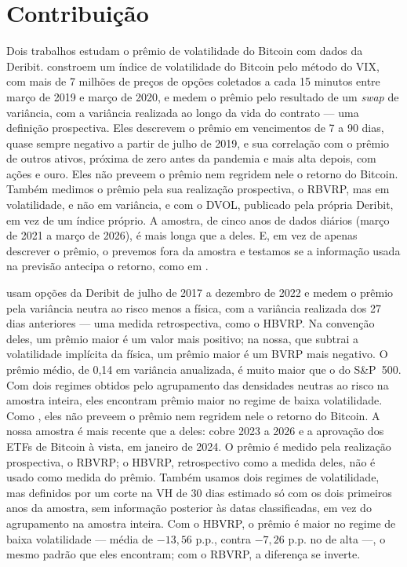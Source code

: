 \section*{Contribuição}
\label{sec:intro-contribuicao}

Dois trabalhos estudam o prêmio de volatilidade do Bitcoin com dados da
Deribit. \citet{alexanderImeraj2019} constroem um índice de volatilidade do
Bitcoin pelo método do VIX, com mais de 7 milhões de preços de opções coletados
a cada 15 minutos entre março de 2019 e março de 2020, e medem o prêmio pelo
resultado de um \textit{swap} de variância, com a variância realizada ao longo
da vida do contrato --- uma definição prospectiva. Eles descrevem o prêmio em
vencimentos de 7 a 90 dias, quase sempre negativo a partir de julho de 2019, e
sua correlação com o prêmio de outros ativos, próxima de zero antes da pandemia
e mais alta depois, com ações e ouro. Eles não preveem o prêmio nem regridem
nele o retorno do Bitcoin. Também medimos o prêmio pela sua
realização prospectiva, o RBVRP, mas em volatilidade, e não em variância, e com
o DVOL, publicado pela própria Deribit, em vez de um índice próprio. A amostra,
de cinco anos de dados diários (março de 2021 a março de 2026), é mais longa que
a deles. E, em vez de apenas descrever o prêmio, o prevemos fora da
amostra e testamos se a informação usada na previsão antecipa o retorno, como em
\citet{bollerslev2009expected}.

\citet{almeida2024cryptoVRP} usam opções da Deribit de julho de 2017 a dezembro
de 2022 e medem o prêmio pela variância neutra ao risco menos a física, com a
variância realizada dos 27 dias anteriores --- uma medida retrospectiva, como o
HBVRP. Na convenção deles, um prêmio maior é um valor mais positivo; na
nossa, que subtrai a volatilidade implícita da física, um prêmio maior é
um BVRP mais negativo. O prêmio médio, de 0,14 em variância anualizada, é muito
maior que o do S\&P~500. Com dois regimes obtidos pelo agrupamento das
densidades neutras ao risco na amostra inteira, eles encontram prêmio maior no
regime de baixa volatilidade. Como \citet{alexanderImeraj2019}, eles não
preveem o prêmio nem regridem nele o retorno do Bitcoin. A nossa amostra
é mais recente que a deles: cobre 2023 a 2026 e a aprovação dos
ETFs de Bitcoin à vista, em janeiro de 2024. O prêmio é medido pela realização
prospectiva, o RBVRP; o HBVRP, retrospectivo como a medida deles, não é usado
como medida do prêmio. Também usamos dois regimes
de volatilidade, mas definidos por um corte na VH de 30 dias estimado só com os
dois primeiros anos da amostra, sem informação posterior às datas
classificadas, em vez do agrupamento na amostra inteira. Com o HBVRP, o prêmio
é maior no regime de baixa volatilidade --- média de $-13{,}56$ p.p., contra
$-7{,}26$ p.p. no de alta ---, o mesmo padrão que eles encontram; com o RBVRP,
a diferença se inverte.

